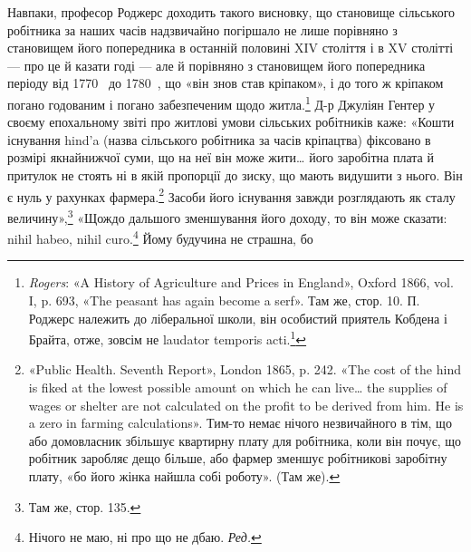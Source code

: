 Навпаки, професор Роджерс доходить такого висновку, що
становище сільського робітника за наших часів надзвичайно
погіршало не лише порівняно з становищем його попередника
в останній половині XIV століття і в XV столітті — про це й
казати годі — але й порівняно з становищем його попередника
періоду від 1770~ до 1780~, що «він знов став кріпаком», і
до того ж кріпаком погано годованим і погано забезпеченим щодо
житла.\footnote{
\emph{Rogers}: «A History of Agriculture and Prices in England», Oxford
1866, vol. I, p. 693, «The peasant has again become a serf». Там же, стор. 10.
П. Роджерс належить до ліберальної школи, він особистий приятель
Кобдена і Брайта, отже, зовсім не laudator temporis acti.\footnote*{
— хвалій минулих часів. \emph{Ред.}
}
} Д-р Джуліян Гентер у своєму епохальному звіті про
житлові умови сільських робітників каже: «Кошти існування
hind’a (назва сільського робітника за часів кріпацтва) фіксовано
в розмірі якнайнижчої суми, що на неї він може жити\dots{} його
заробітна плата й притулок не стоять ні в якій пропорції до зиску,
що мають видушити з нього. Він є нуль у рахунках фармера.\footnote{
«Public Health. Seventh Report», London 1865, p. 242. «The cost of
the hind is fiked at the lowest possible amount on which he can live\dots{} the
supplies of wages or shelter are not calculated on the profit to be derived
from him. He is a zero in farming calculations». Тим-то немає нічого незвичайного
в тім, що або домовласник збільшує квартирну плату для робітника,
коли він почує, що робітник заробляє дещо більше, або фармер
зменшує робітникові заробітну плату, «бо його жінка найшла собі
роботу». (Там же).
}
Засоби його існування завжди розглядають як сталу величину»,\footnote{
Там же, стор. 135.
}
«Щождо дальшого зменшування його доходу, то він може сказати:
nihil habeo, nihil curo.\footnote*{
Нічого не маю, ні про що не дбаю. \emph{Ред.}
} Йому будучина не страшна, бо
\parbreak{}  %
